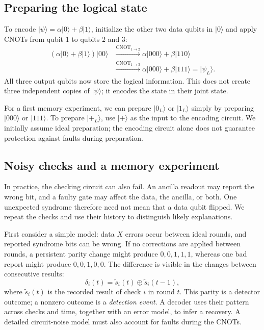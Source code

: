 \documentclass[11pt,a4paper]{article}
\newcommand{\ket}[1]{\lvert #1\rangle}
\newcommand{\cnot}{\operatorname{CNOT}}
\begin{document}
\subsection{Preparing the logical state}

To encode \(\ket\psi=\alpha\ket0+\beta\ket1\), initialize the other
two data qubits in \(\ket0\) and apply CNOTs from qubit \(1\) to
qubits \(2\) and \(3\):
\begin{equation}
\begin{aligned}
(\alpha\ket0+\beta\ket1)\ket{00}
&\xrightarrow{\cnot_{1\to2}}
\alpha\ket{000}+\beta\ket{110}\\
&\xrightarrow{\cnot_{1\to3}}
\alpha\ket{000}+\beta\ket{111}
=\ket{\psi_L}.
\end{aligned}
\end{equation}
All three output qubits now store the logical information. This
does not create three independent copies of \(\ket\psi\); it
encodes the state in their joint state.

For a first memory experiment, we can prepare \(\ket{0_L}\) or
\(\ket{1_L}\) simply by preparing \(\ket{000}\) or \(\ket{111}\).
To prepare \(\ket{+_L}\), use \(\ket+\) as the input to the
encoding circuit. We initially assume ideal preparation; the
encoding circuit alone does not guarantee protection against faults
during preparation.

\subsection{Noisy checks and a memory experiment}\label{sec:memory}

In practice, the checking circuit can also fail. An ancilla readout
may report the wrong bit, and a faulty gate may affect the data,
the ancilla, or both. One unexpected syndrome therefore need not
mean that a data qubit flipped. We repeat the checks and use their
history to distinguish likely explanations.

First consider a simple model: data \(X\) errors occur between ideal
rounds, and reported syndrome bits can be wrong. If no corrections
are applied between rounds, a persistent parity change might produce
\(0,0,1,1,1\), whereas one bad report might produce \(0,0,1,0,0\).
The difference is visible in the changes between consecutive results:
\begin{equation}
\delta_i(t)=\widetilde s_i(t)\oplus\widetilde s_i(t-1),
\end{equation}
where \(\widetilde s_i(t)\) is the recorded result of check \(i\)
in round \(t\). This parity is a detector outcome; a nonzero outcome is a \emph{detection event}.
A decoder uses their pattern across checks and time, together with
an error model, to infer a recovery. A detailed circuit-noise model
must also account for faults during the CNOTs.
\end{document}
